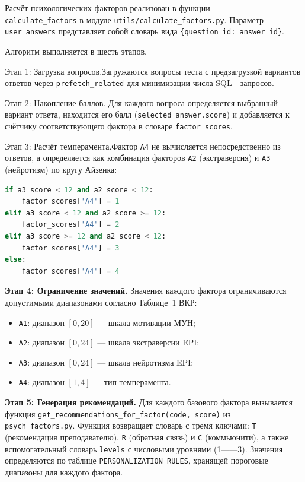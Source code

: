 Расчёт психологических факторов реализован в функции\\ 
\texttt{calculate\_factors} 
в модуле \texttt{utils/calculate\_factors.py}. Параметр 
\texttt{user\_answers} представляет собой словарь вида 
\texttt{\{question\_id: answer\_id\}}.

Алгоритм выполняется в шесть этапов.

Этап 1: Загрузка вопросов.Загружаются вопросы теста с 
предзагрузкой вариантов ответов через \texttt{prefetch\_related} для 
минимизации числа SQL---запросов.

Этап 2: Накопление баллов. Для каждого вопроса определяется 
выбранный вариант ответа, находится его балл (\texttt{selected\_answer.score}) 
и добавляется к счётчику соответствующего фактора в словаре 
\texttt{factor\_scores}.

Этап 3: Расчёт темперамента.Фактор \texttt{A4} не вычисляется 
непосредственно из ответов, а определяется как комбинация факторов 
\texttt{A2} (экстраверсия) и \texttt{A3} (нейротизм) по кругу Айзенка:

\begin{lstlisting}[language=Python, 
    caption={Определение типа темперамента по кругу Айзенка},
    basicstyle=\small\ttfamily]
if a3_score < 12 and a2_score < 12:
    factor_scores['A4'] = 1   
elif a3_score < 12 and a2_score >= 12:
    factor_scores['A4'] = 2   
elif a3_score >= 12 and a2_score < 12:
    factor_scores['A4'] = 3   
else:
    factor_scores['A4'] = 4  
\end{lstlisting}

\textbf{Этап 4: Ограничение значений.} Значения каждого фактора 
ограничиваются допустимыми диапазонами согласно Таблице~1 ВКР:
\begin{itemize}
    \item \texttt{A1}: диапазон $[0, 20]$ --- шкала мотивации МУН;
    \item \texttt{A2}: диапазон $[0, 24]$ --- шкала экстраверсии EPI;
    \item \texttt{A3}: диапазон $[0, 24]$ --- шкала нейротизма EPI;
    \item \texttt{A4}: диапазон $[1, 4]$ --- тип темперамента.
\end{itemize}

\textbf{Этап 5: Генерация рекомендаций.} Для каждого базового фактора 
вызывается функция \texttt{get\_recommendations\_for\_factor(code, score)} 
из \texttt{psych\_factors.py}. Функция возвращает словарь 
с тремя ключами: \texttt{T} (рекомендация преподавателю), \texttt{R} 
(обратная связь) и \texttt{C} (коммьюнити), а также вспомогательный 
словарь \texttt{levels} с числовыми уровнями (1------3). Значения 
определяются по таблице \texttt{PERSONALIZATION\_RULES}, хранящей 
пороговые диапазоны для каждого фактора.

